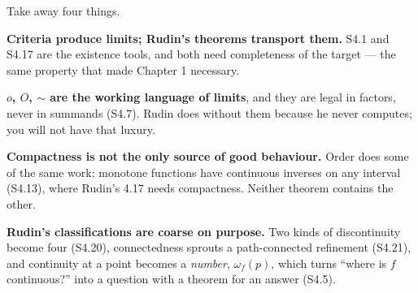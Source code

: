 \begin{recap}
Take away four things.

\smallskip
\raggedright
\textbf{Criteria produce limits; Rudin's theorems transport them.} S4.1 and
S4.17 are the existence tools, and both need completeness of the target ---
the same property that made Chapter 1 necessary.

\smallskip
\textbf{$o$, $O$, $\sim$ are the working language of limits}, and they are
legal in factors, never in summands (S4.7). Rudin does without them because
he never computes; you will not have that luxury.

\smallskip
\textbf{Compactness is not the only source of good behaviour.} Order does
some of the same work: monotone functions have continuous inverses on any
interval (S4.13), where Rudin's 4.17 needs compactness. Neither theorem
contains the other.

\smallskip
\textbf{Rudin's classifications are coarse on purpose.} Two kinds of
discontinuity become four (S4.20), connectedness sprouts a path-connected
refinement (S4.21), and continuity at a point becomes a \emph{number},
$\omega_f(p)$, which turns ``where is $f$ continuous?'' into a question with
a theorem for an answer (S4.5).
\end{recap}
